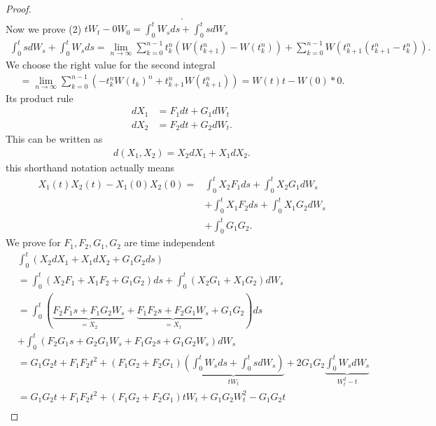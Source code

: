 \begin{proof}
\begin{align*}
 .\end{align*}
 Now we prove (2) $tW_t - 0 W_0  = \int_0^{t} W_s ds + \int_0^{t} s dW_s  $ 
 \begin{align*}
   \int_0^{t} s   dW_s + \int_0^{t} W_s ds = \lim_{n \to \infty} \sum_{k=0}^{n-1} t_k^{n} (W(t_{k+1}^{n} )- W(t_{k}^{n} ))    + \sum_{k=0}^{n-1} W(t_{k+1}^{n}(t_{k+1}^{n} -t_{k}^{n}  ) ) 
 .\end{align*}
 We choose the right value for the second integral
 \begin{align*}
   = \lim_{n\to \infty} \sum_{k=0}^{n-1} (-t_k^{n}W(t_k)^{n} + t_{k+1}^{n}W(t_{k+1}^{n} )   )   =W(t)t - W(0)*0
 .\end{align*}
 Its product rule 
 \begin{align*}
   dX_{1} &= F_{1} dt + G_{1}dW_t \\
   dX_2 &= F_{2} dt + G_{2} dW_t
 .\end{align*}
 This can be written as 
 \begin{align*}
  d(X_{1},X_{2}) = X_{2}dX_{1} + X_{1}dX_{2}
 .\end{align*}
 this shorthand notation actually means 
 \begin{align*}
   X_1(t)X_{2}(t) - X_{1}(0)X_{2}(0) = &\int_0^{t} X_{2}F_{1} ds + \int_0^{t} X_{2}G_{1} dW_s \\
                                       &+ \int_0^{t} X_{1}F_{2} ds + \int_0^{t} X_{1}G_{2}dW_s \\
                                       &+ \int_0^{t}G_{1}G_{2}     
 .\end{align*}
 We prove for $F_{1},F_{2},G_{1},G_{2}$ are time independent 
 \begin{align*}
   &\int_0^{t} (X_{2}dX_{1} + X_{1}dX_{2} + G_{1}G_{2}ds)  \\
   &= \int_0^{t} (X_{2}F_{1}+X_{1}F_{2} + G_{1}G_{2}) ds + \int_0^{t} (X_{2}G_{1} + X_{1}G_{2})  dW_s \\
   &= \int_0^{t} (\underbrace{F_{2}F_{1}s + F_{1}G_{2}W_s}_{=X_{2}} + \underbrace{F_{1}F_{2}s+F_{2}G_{1}W_s}_{=X_{1}} +G_{1}G_{2}) ds \\ 
   &+ \int_0^{t} (F_{2}G_{1}s + G_{2}G_{1}W_s+F_{1}G_{2}s + G_{1}G_{2}W_s) dW_s \\
   &= G_{1}G_{2}t + F_{1}F_{2}t^2 + (F_{1}G_{2}+F_{2}G_{1})\underbrace{\left(\int_0^{t} W_s ds + \int_0^{t}  s dW_s\right)}_{tW_t} + 2G_{1}G_{2} \underbrace{\int_0^{t} W_s dW_s}_{W_t^2-t} \\
   &=G_{1}G_{2}t + F_{1}F_{2}t^2 + (F_{1}G_{2}+F_{2}G_{1}) tW_t +G_{1}G_{2}W_t^2 - G_{1}G_{2}t \\

\end{align*}
\end{proof}
